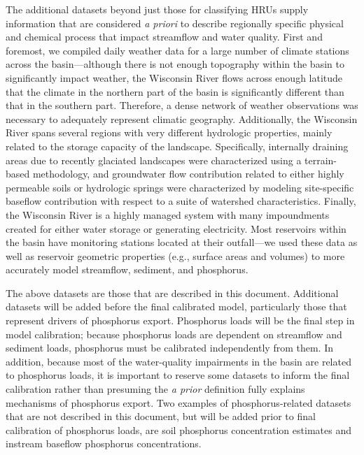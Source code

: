 The additional datasets beyond just those for classifying HRUs supply
information that are considered \textit{a priori} to describe regionally
specific physical and chemical process that impact streamflow and water quality.
First and foremost, we compiled daily weather data for a large number of climate
stations across the basin---although there is not enough topography within the
basin to significantly impact weather, the Wisconsin River flows across enough
latitude that the climate in the northern part of the basin is significantly
different than that in the southern part. Therefore, a dense network of weather
observations was necessary to adequately represent climatic geography.
Additionally, the Wisconsin River spans several regions with very different
hydrologic properties, mainly related to the storage capacity of the landscape.
Specifically, internally draining areas due to recently glaciated landscapes
were characterized using a terrain-based methodology, and groundwater flow
contribution related to either highly permeable soils or hydrologic springs were
characterized by modeling site-specific baseflow contribution with respect to a
suite of watershed characteristics. Finally, the Wisconsin River is a highly
managed system with many impoundments created for either water storage or
generating electricity. Most reservoirs within the basin have monitoring
stations located at their outfall---we used these data as well as reservoir
geometric properties (e.g., surface areas and volumes) to more accurately model
streamflow, sediment, and phosphorus.

The above datasets are those that are described in this document. Additional
datasets will be added before the final calibrated model, particularly those
that represent drivers of phosphorus export. Phosphorus loads will be the final
step in model calibration; because phosphorus loads are dependent on streamflow
and sediment loads, phosphorus must be calibrated independently from them. In
addition, because most of the water-quality impairments in the basin are related
to phosphorus loads, it is important to reserve some datasets to inform the
final calibration rather than presuming the \textit{a prior} definition fully
explains mechanisms of phosphorus export. Two examples of phosphorus-related
datasets that are not described in this document, but will be added prior to
final calibration of phosphorus loads, are soil phosphorus concentration
estimates and instream baseflow phosphorus concentrations.

